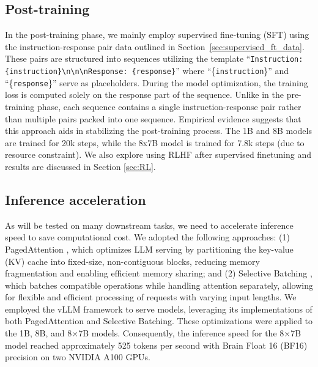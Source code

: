 
\subsection{Post-training}\label{sec:post_train}
In the post-training phase, we mainly employ supervised fine-tuning (SFT) using the instruction-response pair data outlined in Section~\ref{sec:supervised_ft_data}. These pairs are structured into sequences utilizing the template  ``\texttt{Instruction: \{instruction\}\textbackslash{}n\textbackslash{}n\textbackslash{}nResponse: \{response\}}'' where ``\{\texttt{instruction}\}'' and ``\{\texttt{response}\}'' serve as placeholders. During the model optimization, the training loss is computed solely on the response part of the sequence. Unlike in the pre-training phase, each sequence contains a single instruction-response pair rather than multiple pairs packed into one sequence. Empirical evidence suggests that this approach aids in stabilizing the post-training process. The 1B and 8B models are trained for 20k steps, while the 8x7B model is trained for 7.8k steps (due to resource constraint). We also explore using RLHF after supervised finetuning and results are discussed in Section \ref{sec:RL}.


\subsection{Inference acceleration}
As \ourM{} will be tested on many downstream tasks, we need to accelerate inference speed to save computational cost. We adopted the following approaches: (1) PagedAttention \cite{pagedattention}, which optimizes LLM serving by partitioning the key-value (KV) cache into fixed-size, non-contiguous blocks, reducing memory fragmentation and enabling efficient memory sharing; and (2) Selective Batching \cite{orca}, which batches compatible operations while handling attention separately, allowing for flexible and efficient processing of requests with varying input lengths. We employed the vLLM framework \cite{vllm2024} to serve \ourM{} models, leveraging its implementations of both PagedAttention and Selective Batching. These optimizations were applied to the 1B, 8B, and 8×7B models. Consequently, the inference speed for the \ourM{} 8×7B model reached approximately 525 tokens per second with Brain Float 16 (BF16) precision on two NVIDIA A100 GPUs.